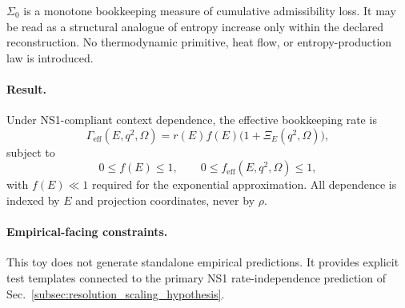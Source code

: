 \documentclass[aps,prx,onecolumn,11pt]{revtex4-2}
\theoremstyle{plain}
\theoremstyle{definition}
\theoremstyle{remark}
\begin{document}
\(\Sigma_0\) is a monotone bookkeeping measure of cumulative
admissibility loss. It may be read as a structural analogue of entropy
increase only within the declared reconstruction. No thermodynamic
primitive, heat flow, or entropy-production law is introduced.

\paragraph{Result.}

Under NS1-compliant context dependence, the effective bookkeeping rate is
\begin{equation}
\Gamma_{\mathrm{eff}}(E,q^2,\Omega)
=
r(E)f(E)\bigl(1+\Xi_E(q^2,\Omega)\bigr),
\label{eq:toy_unified_gamma_eff}
\end{equation}
subject to
\[
0\leq f(E)\leq 1,
\qquad
0\leq f_{\mathrm{eff}}(E,q^2,\Omega)\leq 1,
\]
with \(f(E)\ll1\) required for the exponential approximation. All
dependence is indexed by \(E\) and projection coordinates, never by
\(\rho\).

\paragraph{Empirical-facing constraints.}

This toy does not generate standalone empirical predictions. It
provides explicit test templates connected to the primary NS1
rate-independence prediction of
Sec.~\ref{subsec:resolution_scaling_hypothesis}.
\end{document}
